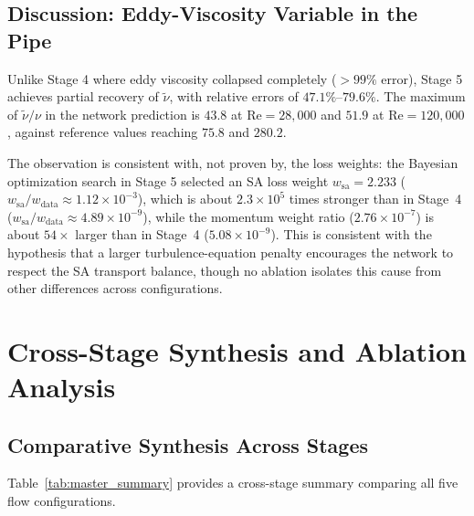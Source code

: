 \documentclass[11pt,a4paper]{article}
\begin{document}
\subsection{Discussion: Eddy-Viscosity Variable in the Pipe}
\label{sec:stage5_disc}
Unlike Stage 4 where eddy viscosity collapsed completely ($>99\%$ error), Stage 5 achieves partial recovery of $\tilde{\nu}$, with relative errors of $47.1\%$--$79.6\%$. The maximum of $\tilde{\nu}/\nu$ in the network prediction is $43.8$ at $\mathrm{Re}=28{,}000$ and $51.9$ at $\mathrm{Re}=120{,}000$, against reference values reaching $75.8$ and $280.2$. 

The observation is consistent with, not proven by, the loss weights: the Bayesian optimization search in Stage 5 selected an SA loss weight $w_{\mathrm{sa}} = 2.233$ ($w_{\mathrm{sa}}/w_{\mathrm{data}} \approx 1.12\times 10^{-3}$), which is about $2.3\times 10^5$ times stronger than in Stage~4 ($w_{\mathrm{sa}}/w_{\mathrm{data}} \approx 4.89\times 10^{-9}$), while the momentum weight ratio ($2.76\times 10^{-7}$) is about $54\times$ larger than in Stage~4 ($5.08\times 10^{-9}$). This is consistent with the hypothesis that a larger turbulence-equation penalty encourages the network to respect the SA transport balance, though no ablation isolates this cause from other differences across configurations.

\section{Cross-Stage Synthesis and Ablation Analysis}
\label{sec:synthesis}

\subsection{Comparative Synthesis Across Stages}
Table~\ref{tab:master_summary} provides a cross-stage summary comparing all five flow configurations.
\end{document}
